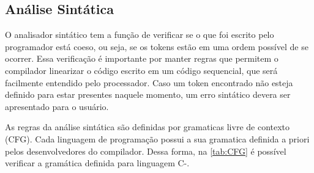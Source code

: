 \documentclass[
	12pt,				%
	oneside,
	a4paper,			%
	english,			%
	french,				%
	spanish,			%
	brazil,				%
	]{abntex2}
\begin{document}
\subsection{Análise Sintática}

O analisador sintático tem a função de verificar se o que foi escrito pelo programador está coeso, ou seja, se os tokens estão em uma ordem possível de se ocorrer. Essa verificação é importante por manter regras que permitem o compilador linearizar o código escrito em um código sequencial, que será facilmente entendido pelo processador. Caso um token encontrado não esteja definido para estar presentes naquele momento, um erro sintático devera ser apresentado para o usuário.

As regras da análise sintática são definidas por gramaticas livre de contexto (CFG). Cada linguagem de programação possui a sua gramatica definida a priori pelos desenvolvedores do compilador. Dessa forma, na \autoref{tab:CFG} é possível verificar a gramática definida para linguagem C-. 
\end{document}
